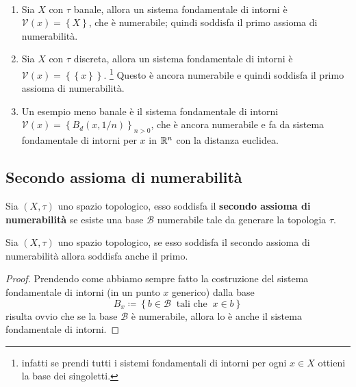 \begin{example}	\
\begin{enumerate}
	\item Sia $X$ con $\tau$ banale, allora un sistema fondamentale di intorni è $\mathcal{V}(x) = \left\{X\right\}$, che è numerabile; quindi soddisfa il primo assioma di numerabilità.
	\item Sia $X$ con $\tau$ discreta, allora un sistema fondamentale di intorni è \newline $\mathcal{V}(x) = \left\{\left\{x\right\}\right\}$. 
	\footnote{infatti se prendi tutti i sistemi fondamentali di intorni per ogni $x\in X$ ottieni la base dei singoletti.} 
	Questo è ancora numerabile e quindi soddisfa il primo assioma di numerabilità.
	\item Un esempio meno banale è il sistema fondamentale di intorni \newline$\mathcal{V}(x) = \left\{B_d(x, 1/n)\right\}_{n > 0}$, che è ancora numerabile e fa da sistema fondamentale di intorni per $x$ in $\mathbb{R}^n$ con la distanza euclidea.
\end{enumerate}
\end{example}



\subsection{\textcolor{TopGener}{\textbf{Secondo assioma di numerabilità}}}



\begin{definition}
	Sia $(X,\tau)$ uno spazio topologico, esso soddisfa il \textbf{secondo assioma di numerabilità} se esiste una base $\mathcal{B}$ numerabile tale da generare la topologia $\tau$. 
\end{definition}

\begin{lemma}
	Sia $(X,\tau)$ uno spazio topologico, se esso soddisfa il secondo assioma di numerabilità allora soddisfa anche il primo. 
\end{lemma}
\begin{proof}
	Prendendo come abbiamo sempre fatto la costruzione del sistema fondamentale di intorni (in un punto $x$ generico) dalla base
	\begin{equation*}
	B_x \coloneqq \left\{ b \in \mathcal{B} \ \text{ tali che } \ x \in b \right\}
	\end{equation*}
	risulta ovvio che se la base $\mathcal{B}$ è numerabile, allora lo è anche il sistema fondamentale di intorni.
\end{proof}

